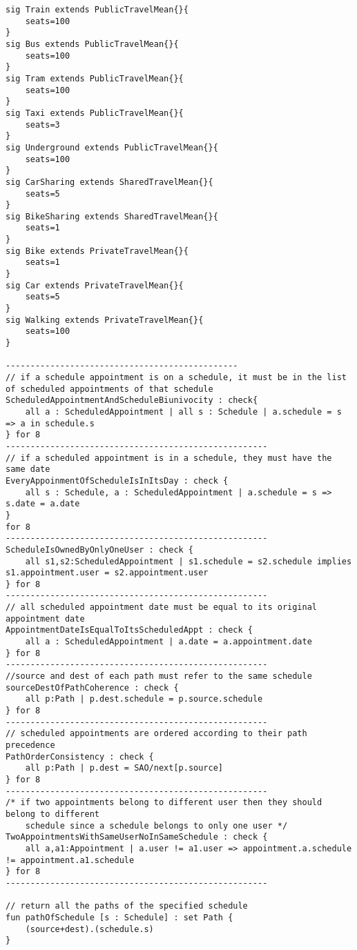 \begin{lstlisting}
sig Train extends PublicTravelMean{}{
	seats=100
}
sig Bus extends PublicTravelMean{}{
	seats=100
}
sig Tram extends PublicTravelMean{}{
	seats=100
}
sig Taxi extends PublicTravelMean{}{
	seats=3
}
sig Underground extends PublicTravelMean{}{
	seats=100
}
sig CarSharing extends SharedTravelMean{}{
	seats=5
}
sig BikeSharing extends SharedTravelMean{}{
	seats=1
}
sig Bike extends PrivateTravelMean{}{
	seats=1
}
sig Car extends PrivateTravelMean{}{
	seats=5
}
sig Walking extends PrivateTravelMean{}{
	seats=100
}

-----------------------------------------------
// if a schedule appointment is on a schedule, it must be in the list of scheduled appointments of that schedule
ScheduledAppointmentAndScheduleBiunivocity : check{
	all a : ScheduledAppointment | all s : Schedule | a.schedule = s => a in schedule.s
} for 8
-----------------------------------------------------
// if a scheduled appointment is in a schedule, they must have the same date
EveryAppoinmentOfScheduleIsInItsDay : check {
	all s : Schedule, a : ScheduledAppointment | a.schedule = s => s.date = a.date
}
for 8
-----------------------------------------------------
ScheduleIsOwnedByOnlyOneUser : check {
	all s1,s2:ScheduledAppointment | s1.schedule = s2.schedule implies s1.appointment.user = s2.appointment.user
} for 8
-----------------------------------------------------
// all scheduled appointment date must be equal to its original appointment date
AppointmentDateIsEqualToItsScheduledAppt : check {
	all a : ScheduledAppointment | a.date = a.appointment.date
} for 8
-----------------------------------------------------
//source and dest of each path must refer to the same schedule
sourceDestOfPathCoherence : check {
	all p:Path | p.dest.schedule = p.source.schedule
} for 8
-----------------------------------------------------
// scheduled appointments are ordered according to their path precedence
PathOrderConsistency : check {
	all p:Path | p.dest = SAO/next[p.source]
} for 8
-----------------------------------------------------
/* if two appointments belong to different user then they should belong to different 
    schedule since a schedule belongs to only one user */ 
TwoAppointmentsWithSameUserNoInSameSchedule : check {
	all a,a1:Appointment | a.user != a1.user => appointment.a.schedule != appointment.a1.schedule
} for 8
-----------------------------------------------------

// return all the paths of the specified schedule
fun pathOfSchedule [s : Schedule] : set Path {
	(source+dest).(schedule.s)
}


\end{lstlisting}
